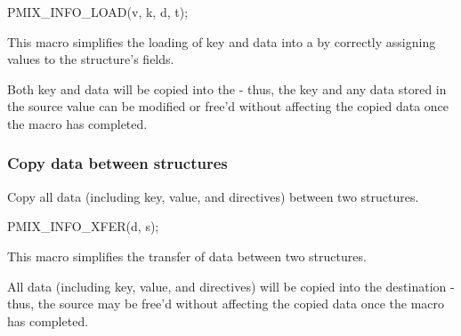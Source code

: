 \cspecificstart
\begin{codepar}
PMIX_INFO_LOAD(v, k, d, t);
\end{codepar}
\cspecificend

\begin{arglist}
\end{arglist}

This macro simplifies the loading of key and data into a  by correctly assigning values to the structure's fields.

\adviceuserstart
Both key and data will be copied into the  - thus, the key and any data stored in the source value can be modified or free'd without affecting the copied data once the macro has completed.
\adviceuserend

\subsubsection{Copy data between  structures}

Copy all data (including key, value, and directives) between two  structures.

\cspecificstart
\begin{codepar}
PMIX_INFO_XFER(d, s);
\end{codepar}
\cspecificend

\begin{arglist}
\end{arglist}

This macro simplifies the transfer of data between two structures.

\adviceuserstart
All data (including key, value, and directives) will be copied into the destination  - thus, the source  may be free'd without affecting the copied data once the macro has completed.
\adviceuserend


